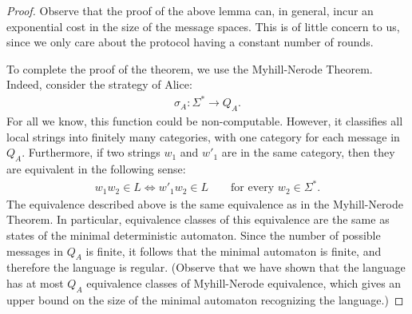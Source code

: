\begin{proof}
  Observe that the proof of the above lemma can, in general, incur an exponential cost in the size of the message spaces. This is of little concern to us, since we only care about the protocol having a constant number of rounds.

  To complete the proof of the theorem, we use the  Myhill-Nerode Theorem.  Indeed, consider the strategy of  Alice: 
  \begin{align*}
  \sigma_A : \Sigma^* \to Q_A.
  \end{align*}
  For all we know, this function could be non-computable. However, it classifies all local strings into finitely many categories, with one category for each message in $Q_A$. Furthermore, if two strings $w_1$ and $w'_1$ are in the same category, then they are equivalent in the following sense: 
  \begin{align}\label{eq:myhill-nerode-equivalence}
  w_1 w_2 \in L \Leftrightarrow w'_1 w_2 \in L 
  \qquad \text{for every $w_2 \in \Sigma^*$.}
  \end{align}
  The equivalence described above is the same equivalence as in the Myhill-Nerode Theorem. In particular, equivalence classes of this equivalence are the same as states of the minimal deterministic automaton. Since the number of possible messages in $Q_A$ is finite, it follows that the minimal automaton is finite, and therefore the language is regular.  (Observe that we have shown that the language has at most $Q_A$ equivalence classes of Myhill-Nerode equivalence, which gives an upper bound on the size of the minimal automaton recognizing the language.)
\end{proof}


